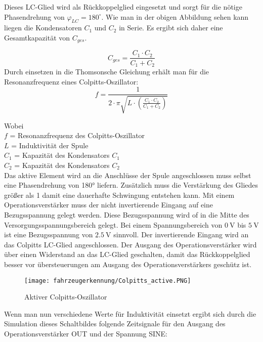 Dieses LC-Glied wird als Rückkoppelglied eingesetzt und sorgt für die nötige Phasendrehung von $\varphi_{LC} = 180^{\circ}$. Wie man in der obigen Abbildung sehen kann liegen die Kondensatoren 
$C_{1}$ und $C_{2}$ in Serie. Es ergibt sich daher eine Gesamtkapazität von $C_{ges}$.

\begin{equation} \label{eq:c_gescolpitts}
    C_{ges} = \frac{C_{1} \cdot C_{2}}{C_{1} + C_{2}}
\end{equation}
Durch einsetzen in die Thomsonsche Gleichung erhält man für die Resonanzfrequenz eines Colpitts-Oszillator:
\begin{equation} \label{eq:colpitts}
    f = \frac{1}{2 \cdot \pi \sqrt{L \cdot \left( \frac{C_{1} \cdot C_{2}}{C_{1} + C_{2}} \right) }}
\end{equation}

Wobei \\
$f$ = Resonanzfrequenz des Colpitts-Oszillator\\
$L$ = Induktivität der Spule\\
$C_{1}$ = Kapazität des Kondensators $C_{1}$\\
$C_{2}$ = Kapazität des Kondensators $C_{2}$\\

\pagebreak
Das aktive Element wird an die Anschlüsse der Spule angeschlossen muss selbst eine Phasendrehung von 180° liefern. Zusätzlich muss die Verstärkung des Gliedes größer als 1 damit eine dauerhafte 
Schwingung entstehen kann. Mit einem Operationsverstärker muss der nicht invertierende Eingang auf eine Bezugsspannung gelegt werden. Diese Bezugsspannung wird of in die Mitte des Versorgungsspannungsbereich
gelegt. Bei einem Spannungsbereich von $\SI{0}{\volt}$ bis $\SI{5}{\volt}$ ist eine Bezugsspannung von $\SI{2,5}{\volt}$ sinnvoll. Der invertierende Eingang wird an das Colpitts LC-Glied angeschlossen. Der Ausgang des Operationsverstärker wird über
einen Widerstand an das LC-Glied geschalten, damit das Rückkoppelglied besser vor übersteuerungen am Ausgang des Operationsverstärkers geschütz ist. 

\begin{figure}[H]
    \centering
    \texttt{[image: fahrzeugerkennung/Colpitts\_active.PNG]}
    \caption{Aktiver Colpitts-Oszillator}
\end{figure}

Wenn man nun verschiedene Werte für Induktivität einsetzt ergibt sich durch die Simulation dieses Schaltbildes folgende Zeitsignale für den Ausgang des Operationsverstärker OUT und der Spannung SINE:

